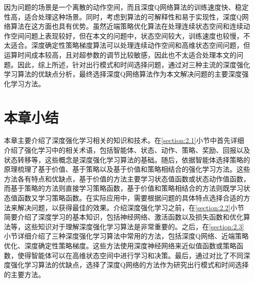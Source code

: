 因为问题的场景是一个离散的动作空间，而且深度Q网络算法的训练速度快、稳定性高，适合处理这种场景。同时，考虑到算法的可解释性和易于实现性，深度Q网络算法在这方面也具有优势。虽然近端策略优化算法在处理连续状态空间和连续动作空间问题上表现较好，但在本文的问题中，状态空间较大，训练速度也较慢，不太适合。深度确定性策略梯度算法可以处理连续动作空间和高维状态空间问题，但运算时间成本较高，且对超参数的调节比较敏感，因此也不太适合处理本文的问题。因此，综上所述，针对出行模式和时间选择问题，通过对三种主流的深度强化学习算法的优缺点分析，最终选择深度Q网络算法作为本文解决问题的主要深度强化学习方法。

\section{本章小结}

本章主要介绍了深度强化学习相关的知识和技术。在\ref{section:2.1}小节中首先详细介绍了强化学习中的相关术语，包括智能体、状态、动作、策略、奖励、回报以及状态转移等，这些概念是深度强化学习算法的基础。随后，依据智能体选择策略的原理梳理了基于价值、基于策略以及基于价值和策略相结合的强化学习方法。这些方法各有特点和优缺点，基于价值的方法主要学习状态值函数或状态动作值函数，而基于策略的方法则直接学习策略函数，基于价值和策略相结合的方法则既学习状态值函数又学习策略函数。在实际应用中，需要根据问题的具体特点选择合适的方法来解决问题，以获得最佳的效果。介绍深度强化学习之前，在\ref{section:2.2}小节简要介绍了深度学习的基本知识，包括神经网络、激活函数以及损失函数和优化算法等，这些知识对于理解深度强化学习算法是非常重要的。之后，在\ref{section:2.3}小节详细介绍了三种深度强化学习算法中常用的方法，包括深度Q网络、近端策略优化、深度确定性策略梯度。这些方法使用深度神经网络来近似值函数或策略函数，使得智能体可以在高维状态空间中进行学习和决策。最后，通过对比了不同深度强化学习算法的优缺点，选择了深度Q网络的方法作为研究出行模式和时间选择的主要方法。